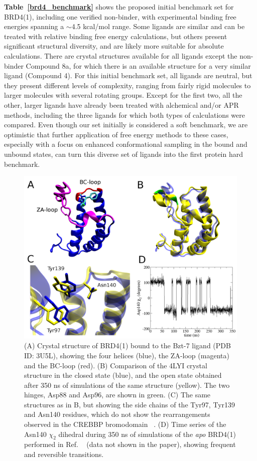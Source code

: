 \documentclass[aps,pre,twocolumn,nofootinbib,superscriptaddress,10pt, final,tightenlines]{revtex4-1}
\begin{document}
{\bf Table~\ref{brd4_benchmark}} shows the proposed initial benchmark set for BRD4(1), including one verified non-binder, with experimental binding free energies spanning a $\sim$4.5 kcal/mol range. 
Some ligands are similar and can be treated with relative binding free energy calculations, but others present significant structural diversity, and are likely more suitable for absolute calculations.  
There are crystal structures available for all ligands except the non-binder Compound 8a, for which there is an available structure for a very similar ligand (Compound 4).   
For this initial benchmark set, all ligands are neutral, but they present different levels of complexity, ranging from fairly rigid molecules to larger molecules with several rotating groups. 
Except for the first two, all the other, larger ligands have already been treated with alchemical and/or APR methods, including the three ligands for which both types of calculations were compared.   
Even though our set initially is considered a soft benchmark, we are optimistic that further application of free energy methods to these cases, especially with a focus on enhanced conformational sampling in the bound and unbound states, can turn this diverse set of ligands into the first protein hard benchmark.  

\begin{figure}
\includegraphics[width=\textwidth]{figures/brd4.pdf}
\caption{\label{fig:brd4} 
(A) Crystal structure of BRD4(1) bound to the Bzt-7 ligand (PDB ID: 3U5L), showing the four helices (blue), the ZA-loop (magenta) and the BC-loop (red). 
(B) Comparison of the 4LYI crystal structure in the closed state (blue), and the open state obtained after 350 ns of simulations of the same structure (yellow).
The two hinges, Asp88 and Asp96, are shown in green. (C) The same structures as in B, but showing the side chains of the  Tyr97, Tyr139 and Asn140 residues, which do not show the rearrangements observed in the CREBBP bromodomain ~\cite{Steiner:2013:FEBSLett.}. 
(D) Time series of the Asn140 $\chi_2$ dihedral during 350 ns of simulations of the \emph{apo} BRD4(1) performed in Ref. ~\cite{Heinzelmann:2017:J.Chem.TheoryComput.} (data not shown in the paper), showing frequent and reversible transitions.
}
\end{figure}
\end{document}
